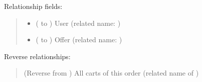 \documentclass[letterpaper,10pt,english]{sphinxmanual}
\begin{document}
\begin{fulllineitems}
\begin{quote}
\begin{description}
\begin{itemize}
\end{itemize}

\end{description}\end{quote}

\sphinxAtStartPar
Relationship fields:
\begin{quote}\begin{description}
\begin{itemize}
\item {} 
\sphinxAtStartPar
{} ( to {\hyperref[\detokenize{accounts:accounts.models.Shopper}]{}}) \sphinxhyphen{}\sphinxhyphen{} User (related name: )

\item {} 
\sphinxAtStartPar
{} ( to {\hyperref[\detokenize{store:store.models.Offer}]{}}) \sphinxhyphen{}\sphinxhyphen{} Offer (related name: )

\end{itemize}

\end{description}\end{quote}

\sphinxAtStartPar
Reverse relationships:
\begin{quote}\begin{description}
\sphinxAtStartPar
{} (Reverse  from {\hyperref[\detokenize{store:store.models.Cart}]{}}) \sphinxhyphen{}\sphinxhyphen{} All carts of this order (related name of {\hyperref[\detokenize{store:store.models.Cart.orders}]{}})

\end{description}\end{quote}


\end{fulllineitems}
\end{document}

